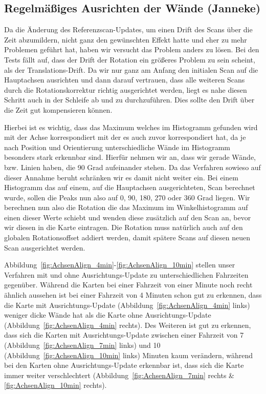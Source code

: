 \subsection{Regelmäßiges Ausrichten der Wände (Janneke)}

Da die Änderung des Referenzscan-Updates, um einen Drift des Scans über die Zeit abzumildern, nicht ganz den gewünschten Effekt hatte und eher zu mehr Problemen geführt hat, haben wir versucht das Problem anders zu lösen. Bei den Tests fällt auf, dass der Drift der Rotation ein größeres Problem zu sein scheint, als der Translations-Drift. Da wir nur ganz am Anfang den initialen Scan auf die Hauptachsen ausrichten und dann darauf vertrauen, dass alle weiteren Scans durch die Rotationskorrektur richtig ausgerichtet werden, liegt es nahe diesen Schritt auch in der Schleife ab und zu durchzuführen. Dies sollte den Drift über die Zeit gut kompensieren können.

Hierbei ist es wichtig, dass das Maximum welches im Histogramm gefunden wird mit der Achse korrespondiert mit der es auch zuvor korrespondiert hat, da je nach Position und Orientierung unterschiedliche Wände im Histogramm besonders stark erkennbar sind. Hierfür nehmen wir an, dass wir gerade Wände, bzw. Linien haben, die 90 Grad aufeinander stehen. Da das Verfahren sowieso auf dieser Annahme beruht schränken wir es damit nicht weiter ein. Bei einem Histogramm das auf einem, auf die Hauptachsen ausgerichteten, Scan berechnet wurde, sollen die Peaks nun also auf 0, 90, 180, 270 oder 360 Grad liegen. Wir berechnen nun also die Rotation die das Maximum im Winkelhistogramm auf einen dieser Werte schiebt und wenden diese zusätzlich auf den Scan an, bevor wir diesen in die Karte eintragen. Die Rotation muss natürlich auch auf den globalen Rotationsoffset addiert werden, damit spätere Scans auf diesen neuen Scan ausgerichtet werden.

Abbildung~\ref{fig:AchsenAlign_4min}-\ref{fig:AchsenAlign_10min} stellen unser Verfahren mit und ohne Ausrichtungs-Update zu unterschiedlichen Fahrzeiten gegenüber. Während die Karten bei einer Fahrzeit von einer Minute noch recht ähnlich aussehen ist bei einer Fahrzeit von 4 Minuten schon gut zu erkennen, dass die Karte mit Ausrichtungs-Update (Abbildung~\ref{fig:AchsenAlign_4min} links) weniger dicke Wände hat als die Karte ohne Ausrichtungs-Update (Abbildung~\ref{fig:AchsenAlign_4min} rechts). Des Weiteren ist gut zu erkennen, dass sich die Karten mit Ausrichtungs-Update zwischen einer Fahrzeit von 7 (Abbildung~\ref{fig:AchsenAlign_7min} links) und 10 (Abbildung~\ref{fig:AchsenAlign_10min} links) Minuten kaum verändern, während bei den Karten ohne Ausrichtungs-Update erkennbar ist, dass sich die Karte immer weiter verschlechtert (Abbildung~\ref{fig:AchsenAlign_7min} rechts \& \ref{fig:AchsenAlign_10min} rechts).

